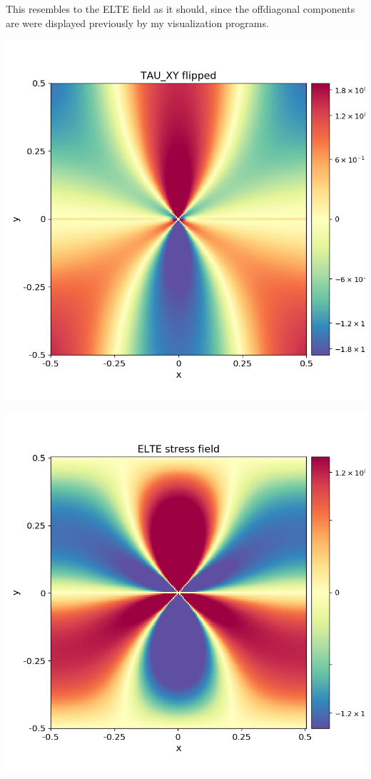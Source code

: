 \documentclass[12pt,a4paper]{article}
\theoremstyle{plain}
\begin{document}
\begin{multicols*}{2}
	\par This resembles to the ELTE field as it should, since the offdiagonal
	components are were displayed previously by my visualization programs.
	
	\begin{minipage}[t]{0.42\columnwidth}
		\centering
		\includegraphics[width=0.8\columnwidth]{elte_stress_field_TAU_XY_flipped.png}
	\end{minipage}
	\begin{minipage}[t]{0.42\columnwidth}
		\centering
		\includegraphics[width=0.8\columnwidth]{elte_stress_field.png}
	\end{minipage}


\end{multicols*}
\end{document}
